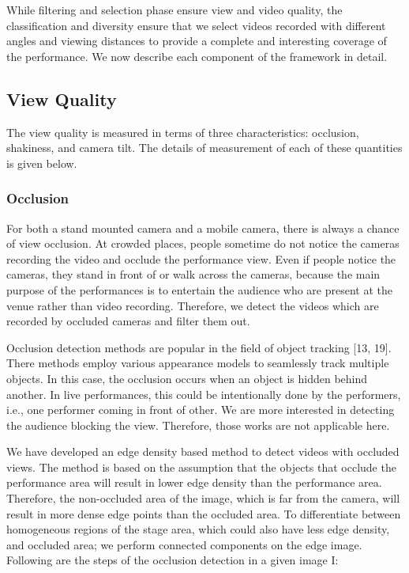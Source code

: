 \documentclass{sig-alternate-05-2015}
\begin{document}
While filtering and selection phase ensure view and video quality,
the classification and diversity ensure that we select videos
recorded with different angles and viewing distances to provide a
complete and interesting coverage of the performance. We now
describe each component of the framework in detail.

\subsection{View Quality}

The view quality is measured in terms of three characteristics:
occlusion, shakiness, and camera tilt. The details of measurement
of each of these quantities is given below.

\subsubsection{Occlusion}
For both a stand mounted camera and a mobile camera, there
is always a chance of view occlusion. At crowded places, people
sometime do not notice the cameras recording the video and occlude
the performance view. Even if people notice the cameras,
they stand in front of or walk across the cameras, because the main
purpose of the performances is to entertain the audience who are
present at the venue rather than video recording. Therefore, we detect
the videos which are recorded by occluded cameras and filter
them out.

Occlusion detection methods are popular in the field of object
tracking [13, 19]. There methods employ various appearance models
to seamlessly track multiple objects. In this case, the occlusion
occurs when an object is hidden behind another. In live performances,
this could be intentionally done by the performers, i.e.,
one performer coming in front of other. We are more interested in
detecting the audience blocking the view. Therefore, those works
are not applicable here.

We have developed an edge density based method to detect videos
with occluded views. The method is based on the assumption that
the objects that occlude the performance area will result in lower
edge density than the performance area. Therefore, the non-occluded
area of the image, which is far from the camera, will result in more
dense edge points than the occluded area. To differentiate between
homogeneous regions of the stage area, which could also have less edge density, and occluded area; we perform connected components
on the edge image. Following are the steps of the occlusion
detection in a given image I:
\end{document}
